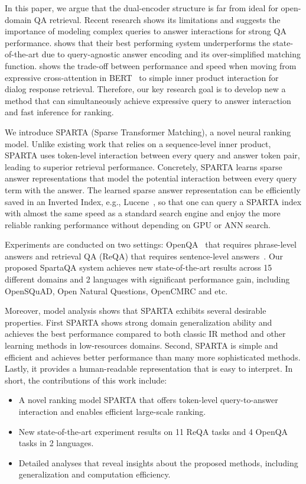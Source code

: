 \documentclass[11pt,a4paper]{article}
\begin{document}
In this paper, we argue that the dual-encoder structure is far from ideal for open-domain QA retrieval. Recent research shows its limitations and suggests the importance of modeling complex queries to answer interactions for strong QA performance. \citet{seo2019real} shows that their best performing system underperforms the state-of-the-art due to query-agnostic answer encoding and its over-simplified matching function. \citet{humeau2019poly} shows the trade-off between performance and speed when moving from expressive cross-attention in BERT~\cite{devlin2018bert} to simple inner product interaction for dialog response retrieval. Therefore, our key research goal is to develop new a method that can simultaneously achieve expressive query to answer interaction and fast inference for ranking.

We introduce SPARTA (Sparse Transformer Matching), a novel neural ranking model. Unlike existing work that relies on a sequence-level inner product, SPARTA uses token-level interaction between every query and answer token pair, leading to superior retrieval performance. Concretely, SPARTA learns sparse answer representations that model the potential interaction between every query term with the answer. The learned sparse answer representation can be efficiently saved in an Inverted Index, e.g., Lucene~\cite{mccandless2010lucene}, so that one can query a SPARTA index with almost the same speed as a standard search engine and enjoy the more reliable ranking performance without depending on GPU or ANN search. 

Experiments are conducted on two settings: OpenQA~\cite{chen2017reading} that requires phrase-level answers and retrieval QA (ReQA) that requires sentence-level answers~\cite{ahmad2019reqa}. Our proposed SpartaQA system achieves new state-of-the-art results across 15 different domains and 2 languages with significant performance gain, including OpenSQuAD, Open Natural Questions, OpenCMRC and etc. 

Moreover, model analysis shows that SPARTA exhibits several desirable properties. First SPARTA shows strong domain generalization ability and achieves the best performance compared to both classic IR method and other learning methods in low-resources domains. Second, SPARTA is simple and efficient and achieves better performance than many more sophisticated methods. Lastly, it provides a human-readable representation that is easy to interpret.  In short, the contributions of this work include:
\begin{itemize}
    \item A novel ranking model SPARTA that offers token-level query-to-answer interaction and enables efficient large-scale ranking.
    \item New state-of-the-art experiment results on 11 ReQA tasks and 4 OpenQA tasks in 2 languages.  
    \item Detailed analyses that reveal insights about the proposed methods, including generalization and computation efficiency.
\end{itemize} 
\end{document}
